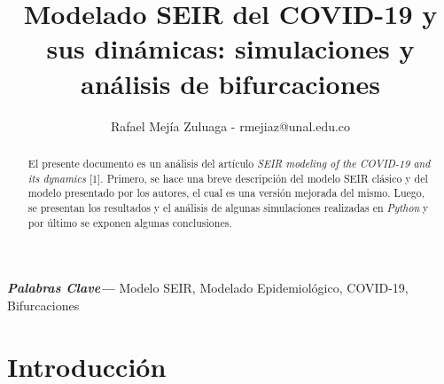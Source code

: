\documentclass[conference]{IEEEtran}
\providecommand{\keywords}[1]
{
  \small	
  \textbf{\textit{Palabras Clave---}} #1
}
\begin{document}
    

\title{Modelado SEIR del COVID-19 y sus dinámicas: simulaciones y análisis de 
bifurcaciones}

\author{Rafael Mejía Zuluaga - rmejiaz@unal.edu.co}

\maketitle


\begin{abstract}
    El presente documento es un análisis del artículo \textit{SEIR modeling of the
    COVID-19 and its dynamics} [1]. Primero, se hace una breve descripción del modelo SEIR 
    clásico y del modelo presentado por los autores, el cual es una versión mejorada del mismo.
    Luego, se presentan los resultados y el análisis de algunas simulaciones realizadas en 
    \textit{Python} y por último se exponen algunas conclusiones.  
    \newline
\end{abstract}

\keywords{Modelo SEIR, Modelado Epidemiológico, COVID-19, Bifurcaciones}

\section{Introducción}
\end{document}
